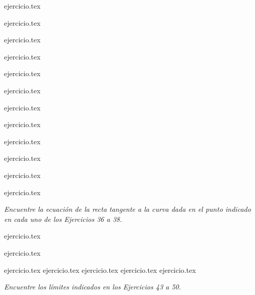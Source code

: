 \begin{enumerate}
    \begin{minipage}{0.45\textwidth}
    \setcounter{enumi}{23}
    {ejercicio.tex}
    \addtocounter{enumi}{1}
    {ejercicio.tex}
    \addtocounter{enumi}{1}
    {ejercicio.tex}
    \addtocounter{enumi}{1}
    {ejercicio.tex}
    \addtocounter{enumi}{1}
    {ejercicio.tex}
    \addtocounter{enumi}{1}
    {ejercicio.tex}
    \end{minipage}%
    \begin{minipage}{0.45\textwidth}
    \setcounter{enumi}{24}
    {ejercicio.tex}
    \addtocounter{enumi}{1}
    {ejercicio.tex}
    \addtocounter{enumi}{1}
    {ejercicio.tex}
    \addtocounter{enumi}{1}
    {ejercicio.tex}
    \addtocounter{enumi}{1}
    {ejercicio.tex}
    \addtocounter{enumi}{1}
    {ejercicio.tex}
    \end{minipage}
\end{enumerate}

\noindent \textit{Encuentre la ecuación de la recta tangente a la curva dada en el punto indicado en cada uno de los Ejercicios 36 a 38.}

\begin{enumerate}
    \begin{minipage}{0.45\textwidth}
    \setcounter{enumi}{35}
    {ejercicio.tex}
    \end{minipage}%
    \begin{minipage}{0.45\textwidth}
    \setcounter{enumi}{36}
    {ejercicio.tex}
    \end{minipage}

    {ejercicio.tex}
    \setcounter{enumi}{38}
    {ejercicio.tex}
    {ejercicio.tex}
    {ejercicio.tex}
    {ejercicio.tex}
\end{enumerate}

\noindent \textit{Encuentre los límites indicados en los Ejercicios 43 a 50.}

